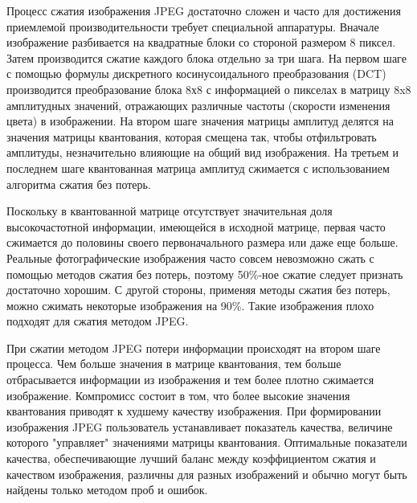 \documentclass[a4paper,12pt]{article}
\theoremstyle{plain}
\begin{document}
Процесс сжатия изображения JPEG достаточно сложен и часто для достижения приемлемой производительности требует специальной аппаратуры. Вначале изображение разбивается на квадратные блоки со стороной размером 8 пиксел. Затем производится сжатие каждого блока отдельно за три шага. На первом шаге с помощью формулы дискретного косинусоидального преобразования (DCT) производится преобразование блока 8х8 с информацией о пикселах в матрицу 8x8 амплитудных значений, отражающих различные частоты (скорости изменения цвета) в изображении. На втором шаге значения матрицы амплитуд делятся на значения матрицы квантования, которая смещена так, чтобы отфильтровать амплитуды, незначительно влияющие на общий вид изображения. На третьем и последнем шаге квантованная матрица амплитуд сжимается с использованием алгоритма сжатия без потерь.

Поскольку в квантованной матрице отсутствует значительная доля высокочастотной информации, имеющейся в исходной матрице, первая часто сжимается до половины своего первоначального размера или даже еще больше. Реальные фотографические изображения часто совсем невозможно сжать с помощью методов сжатия без потерь, поэтому 50\%-ное сжатие следует признать достаточно хорошим. С другой стороны, применяя методы сжатия без потерь, можно сжимать некоторые изображения на 90\%. Такие изображения плохо подходят для сжатия методом JPEG.

При сжатии методом JPEG потери информации происходят на втором шаге процесса. Чем больше значения в матрице квантования, тем больше отбрасывается информации из изображения и тем более плотно сжимается изображение. Компромисс состоит в том, что более высокие значения квантования приводят к худшему качеству изображения. При формировании изображения JPEG пользователь устанавливает показатель качества, величине которого "управляет" значениями матрицы квантования. Оптимальные показатели качества, обеспечивающие лучший баланс между коэффициентом сжатия и качеством изображения, различны для разных изображений и обычно могут быть найдены только методом проб и ошибок.
\end{document}

